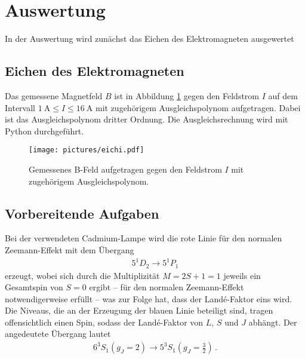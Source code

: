 \section{Auswertung}
\label{sec:Auswertung}
%
In der Auswertung wird zunächst das Eichen des Elektromagneten ausgewertet

\subsection{Eichen des Elektromagneten}%
Das gemessene Magnetfeld $B$ ist in Abbildung \ref{fig:eichi} gegen den Feldstrom $I$ auf dem
Intervall $\SI{1}{\ampere} \le I \le \SI{16}{\ampere}$ mit zugehörigem Ausgleichspolynom
aufgetragen. Dabei ist das Ausgleichspolynom dritter Ordnung.
Die Ausgleichsrechnung wird mit Python \cite{scipy} durchgeführt.
\begin{figure}
	\centering
	\texttt{[image: pictures/eichi.pdf]}
	\caption{Gemessenes B-Feld aufgetragen gegen den Feldstrom $I$ mit zugehörigem Ausgleichspolynom.}
	\label{fig:eichi}
\end{figure}

\subsection{Vorbereitende Aufgaben}
	Bei der verwendeten Cadmium-Lampe wird die rote Linie für den normalen Zeemann-Effekt
	mit dem Übergang
	\begin{align*}
		5^1D_2 \rightarrow 5^1P_1
	\end{align*}
	erzeugt, wobei sich durch die Multiplizität $M=2S+1=1$ jeweils ein Gesamtspin von
	$S=0$ ergibt -- für den normalen Zeemann-Effekt notwendigerweise erfüllt --
	was zur Folge hat, dass der Landé-Faktor eins wird.
	Die Niveaus, die an der Erzeugung der blauen Linie beteiligt sind, tragen offensichtlich
	einen Spin, sodass der Landé-Faktor von $L$, $S$ und $J$ abhängt. Der angedeutete
	Übergang lautet
	\begin{align*}
		6^3S_1 (g_J=2) \rightarrow 5^3S_1 (g_J=\frac{3}{2}) \, \mathrm{.}
	\end{align*}

